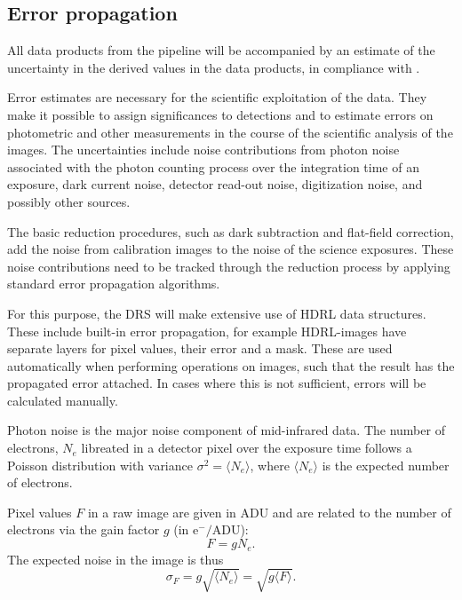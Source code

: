 \subsection{Error propagation}\label{ssec:criticalerrorpropagation}
\label{Sec:critalg_errorprop}

All data products from the pipeline will be accompanied by an
estimate of the uncertainty in the derived values in the data products, in compliance with .

Error estimates are necessary for the scientific
exploitation of the data. They make it possible to assign
significances to detections and to estimate errors on photometric and
other measurements in the course of the scientific analysis of the
images. The uncertainties include noise contributions from photon
noise associated with the photon counting process over the integration
time of an exposure, dark current noise, detector read-out noise,
digitization noise, and possibly other sources.

The basic reduction procedures, such as dark subtraction and
flat-field correction, add the noise from calibration images to the
noise of the science exposures. These noise contributions need to be
tracked through the reduction process by applying standard error
propagation algorithms.

For this purpose, the DRS will make extensive use of \ac{HDRL} data structures.
These include built-in error propagation, for example HDRL-images have separate
layers for pixel values, their error and a mask. These are used automatically
when performing operations on images, such that the result has the propagated
error attached. In cases where this is not sufficient, errors will be calculated
manually.

Photon noise is the major noise component of mid-infrared data. The
number of electrons, $N_{e}$ libreated in a detector pixel over the
exposure time follows a Poisson distribution with variance $\sigma^{2}
= \langle N_{e}\rangle$, where $\langle N_{e}\rangle$ is the expected
number of electrons.

Pixel values $F$ in a raw image are given in ADU and are related to
the number of electrons via the gain factor $g$ (in
$\mathrm{e}^{-}/\mathrm{ADU}$):
\begin{equation}
  \label{eq:gain_def}
  F = g N_{e}.
\end{equation}
The expected noise in the image is thus
\begin{equation}
  \label{eq:noise_adu}
  \sigma_{F} = g\sqrt{\langle N_{e}\rangle} = \sqrt{g \langle F\rangle}.
\end{equation}

